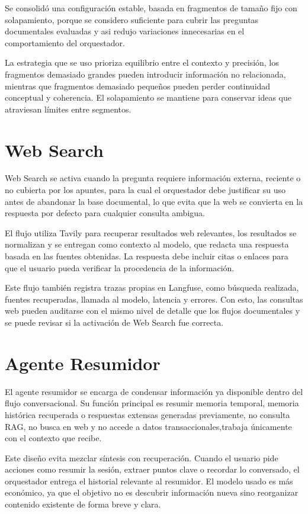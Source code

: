 \documentclass[conference]{IEEEtran}
\begin{document}
Se consolidó una configuración estable, basada en fragmentos de tamaño fijo con solapamiento, porque se considero suficiente para cubrir las preguntas documentales evaluadas y asi redujo variaciones innecesarias en el comportamiento del orquestador.

La estrategia que se uso prioriza equilibrio entre el contexto y precisión, los fragmentos demasiado grandes pueden introducir información no relacionada, mientras que fragmentos demasiado pequeños pueden perder continuidad conceptual y coherencia. El solapamiento se mantiene para conservar ideas que atraviesan límites entre segmentos.

\section{Web Search}

Web Search se activa cuando la pregunta requiere información externa, reciente o no cubierta por los apuntes, para la cual el orquestador debe justificar su uso antes de abandonar la base documental, lo que evita que la web se convierta en la respuesta por defecto para cualquier consulta ambigua. 

El flujo utiliza Tavily para recuperar resultados web relevantes, los resultados se normalizan y se entregan como contexto al modelo, que redacta una respuesta basada en las fuentes obtenidas. La respuesta debe incluir citas o enlaces para que el usuario pueda verificar la procedencia de la información.

Este flujo también registra trazas propias en Langfuse, como búsqueda realizada, fuentes recuperadas, llamada al modelo, latencia y errores. Con esto, las consultas web pueden auditarse con el mismo nivel de detalle que los flujos documentales y se puede revisar si la activación de Web Search fue correcta.

\section{Agente Resumidor}

El agente resumidor se encarga de condensar información ya disponible dentro del flujo conversacional. Su función principal es resumir memoria temporal, memoria histórica recuperada o respuestas extensas generadas previamente, no consulta RAG, no busca en web y no accede a datos transaccionales,trabaja únicamente con el contexto que recibe.

Este diseño evita mezclar síntesis con recuperación. Cuando el usuario pide acciones como resumir la sesión, extraer puntos clave o recordar lo conversado, el orquestador entrega el historial relevante al resumidor. El modelo usado es más económico, ya que el objetivo no es descubrir información nueva sino reorganizar contenido existente de forma breve y clara.
\end{document}
